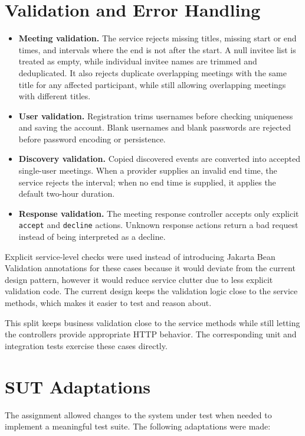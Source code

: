 \section{Validation and Error Handling}

\begin{itemize}
    \item \textbf{Meeting validation.} The service rejects missing titles, missing start or end times, and intervals where the end is not after the start. A null invitee list is treated as empty, while individual invitee names are trimmed and deduplicated. It also rejects duplicate overlapping meetings with the same title for any affected participant, while still allowing overlapping meetings with different titles.
    \item \textbf{User validation.} Registration trims usernames before checking uniqueness and saving the account. Blank usernames and blank passwords are rejected before password encoding or persistence.
    \item \textbf{Discovery validation.} Copied discovered events are converted into accepted single-user meetings. When a provider supplies an invalid end time, the service rejects the interval; when no end time is supplied, it applies the default two-hour duration.
    \item \textbf{Response validation.} The meeting response controller accepts only explicit \texttt{accept} and \texttt{decline} actions. Unknown response actions return a bad request instead of being interpreted as a decline.
\end{itemize}

Explicit service-level checks were used instead of introducing Jakarta Bean Validation annotations for these cases because it would deviate from the current design pattern, however it would reduce service clutter due to less explicit validation code. The current design keeps the validation logic close to the service methods, which makes it easier to test and reason about.

This split keeps business validation close to the service methods while still letting the controllers provide appropriate HTTP behavior. The corresponding unit and integration tests exercise these cases directly.

\section{SUT Adaptations}

The assignment allowed changes to the system under test when needed to implement a meaningful test suite. The following adaptations were made:

